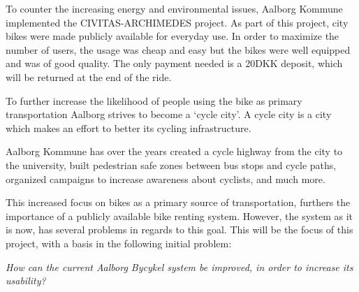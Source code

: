 To counter the increasing energy and environmental issues, Aalborg Kommune implemented the CIVITAS-ARCHIMEDES project\cite{aalborgbycyklenbagcyklen}. As part of this project, city bikes were made publicly available for everyday use.
In order to maximize the number of users, the usage was cheap and easy but the bikes were well equipped and was of good quality\cite{cykelplanlaegning}. The only payment needed is a 20DKK deposit, which will be returned at the end of the ride.

To further increase the likelihood of people using the bike as primary transportation Aalborg strives to become a `cycle city'.
A cycle city is a city which makes an effort to better its cycling infrastructure.\cite{cykelhandlingsplan}

Aalborg Kommune has over the years 
created a cycle highway from the city to the university, \cite{cykelhandlingsplan}
built pedestrian safe zones between bus stops and cycle paths\cite{pedestriansafezone},
organized campaigns to increase awareness about cyclists\cite{cykelbycampaigns},
and much more.

This increased focus on bikes as a primary source of transportation, furthers the importance of a publicly available bike renting system.
However, the system as it is now, has several problems in regards to this goal.
This will be the focus of this project, with a basis in the following initial problem:

\begin{center}
\textit{How can the current Aalborg Bycykel system be improved, in order to increase its usability?}
\end{center}